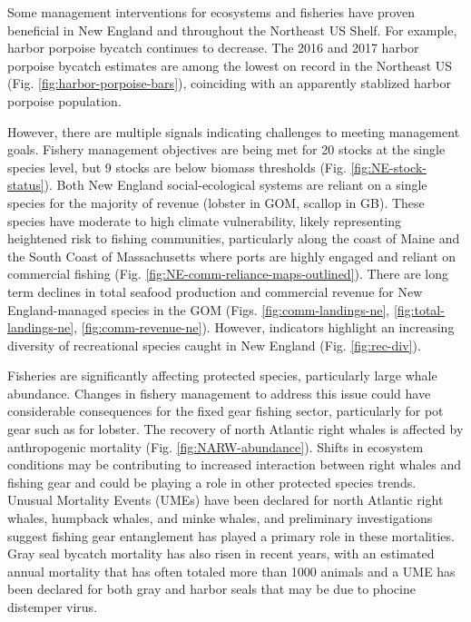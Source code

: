 \documentclass[10pt,]{article}
\begin{document}
Some management interventions for ecosystems and fisheries have proven
beneficial in New England and throughout the Northeast US Shelf. For
example, harbor porpoise bycatch continues to decrease. The 2016 and
2017 harbor porpoise bycatch estimates are among the lowest on record in
the Northeast US (Fig. \ref{fig:harbor-porpoise-bars}), coinciding with
an apparently stablized harbor porpoise population.

However, there are multiple signals indicating challenges to meeting
management goals. Fishery management objectives are being met for 20
stocks at the single species level, but 9 stocks are below biomass
thresholds (Fig. \ref{fig:NE-stock-status}). Both New England
social-ecological systems are reliant on a single species for the
majority of revenue (lobster in GOM, scallop in GB). These species have
moderate to high climate vulnerability, likely representing heightened
risk to fishing communities, particularly along the coast of Maine and
the South Coast of Massachusetts where ports are highly engaged and
reliant on commercial fishing (Fig.
\ref{fig:NE-comm-reliance-maps-outlined}). There are long term declines
in total seafood production and commercial revenue for New
England-managed species in the GOM (Figs. \ref{fig:comm-landings-ne},
\ref{fig:total-landings-ne}, \ref{fig:comm-revenue-ne}). However,
indicators highlight an increasing diversity of recreational species
caught in New England (Fig. \ref{fig:rec-div}).

Fisheries are significantly affecting protected species, particularly
large whale abundance. Changes in fishery management to address this
issue could have considerable consequences for the fixed gear fishing
sector, particularly for pot gear such as for lobster. The recovery of
north Atlantic right whales is affected by anthropogenic mortality (Fig.
\ref{fig:NARW-abundance}). Shifts in ecosystem conditions may be
contributing to increased interaction between right whales and fishing
gear and could be playing a role in other protected species trends.
Unusual Mortality Events (UMEs) have been declared for north Atlantic
right whales, humpback whales, and minke whales, and preliminary
investigations suggest fishing gear entanglement has played a primary
role in these mortalities. Gray seal bycatch mortality has also risen in
recent years, with an estimated annual mortality that has often totaled
more than 1000 animals and a UME has been declared for both gray and
harbor seals that may be due to phocine distemper virus.
\end{document}
